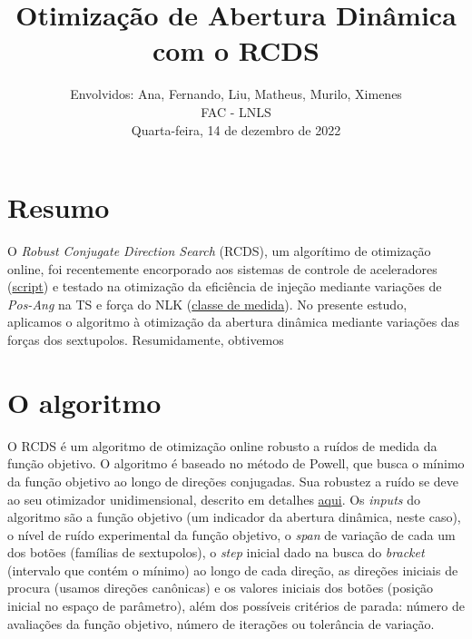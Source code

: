 \documentclass[a4paper,
               keeplastbox,   %
               ]{jacow}
\begin{document}
\title{Otimização de Abertura Dinâmica com o RCDS}

\author{Envolvidos: Ana, Fernando, Liu, Matheus, Murilo, Ximenes \\ FAC - LNLS \\ Quarta-feira, 14 de dezembro de 2022}
\maketitle
%
\section{Resumo}
O \textit{Robust Conjugate Direction Search} (RCDS), um algorítimo de otimização online, foi recentemente encorporado aos sistemas de controle de aceleradores (\href{https://github.com/lnls-fac/apsuite/blob/64708a77ebff0c093700b6c5e78a882ed3edd63a/apsuite/optimization/rcds.py}{script}) e testado na otimização da eficiência de injeção mediante variações de \textit{Pos-Ang} na TS e força do NLK (\href{https://github.com/lnls-fac/apsuite/blob/64708a77ebff0c093700b6c5e78a882ed3edd63a/apsuite/commisslib/rcds_posang.py}{classe de medida}). No presente estudo, aplicamos o algoritmo à otimização da abertura dinâmica mediante variações das forças dos sextupolos. Resumidamente, obtivemos
\section{O algoritmo}
O RCDS é um algoritmo de otimização online robusto a ruídos de medida da função objetivo. O algoritmo é baseado no método de Powell, que busca o mínimo da função objetivo ao longo de direções conjugadas. Sua robustez a ruído se deve ao seu otimizador unidimensional, descrito em detalhes \href{https://www.slac.stanford.edu/pubs/slacpubs/15250/slac-pub-15414.pdf}{aqui}.
Os \textit{inputs} do algoritmo são a função objetivo (um indicador da abertura dinâmica, neste caso), o nível de ruído experimental da função objetivo, o \textit{span} de variação de cada um dos botões (famílias de sextupolos), o \textit{step} inicial dado na busca do \textit{bracket} (intervalo que contém o mínimo) ao longo de cada direção, as direções iniciais de procura (usamos direções canônicas) e os valores iniciais dos botões (posição inicial no espaço de parâmetro), além dos possíveis critérios de parada: número de avaliações da função objetivo, número de iterações ou tolerância de variação.
\end{document}
